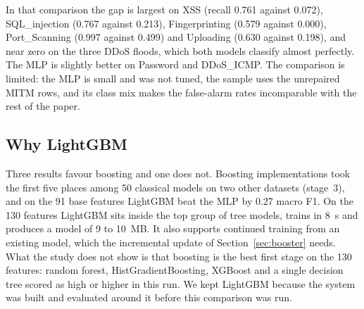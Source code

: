 In that comparison the gap is largest on XSS (recall 0.761 against 0.072), SQL\_injection (0.767 against 0.213), Fingerprinting (0.579 against 0.000), Port\_Scanning (0.997 against 0.499) and Uploading (0.630 against 0.198), and near zero on the three DDoS floods, which both models classify almost perfectly. The MLP is slightly better on Password and DDoS\_ICMP. The comparison is limited: the MLP is small and was not tuned, the sample uses the unrepaired MITM rows, and its class mix makes the false-alarm rates incomparable with the rest of the paper.

\subsection{Why LightGBM}
Three results favour boosting and one does not. Boosting implementations took the first five places among 50 classical models on two other datasets (stage~3), and on the 91 base features LightGBM beat the MLP by 0.27 macro F1. On the 130 features LightGBM sits inside the top group of tree models, trains in 8~s and produces a model of 9 to 10~MB. It also supports continued training from an existing model, which the incremental update of Section~\ref{sec:booster} needs. What the study does not show is that boosting is the best first stage on the 130 features: random forest, HistGradientBoosting, XGBoost and a single decision tree scored as high or higher in this run. We kept LightGBM because the system was built and evaluated around it before this comparison was run.

